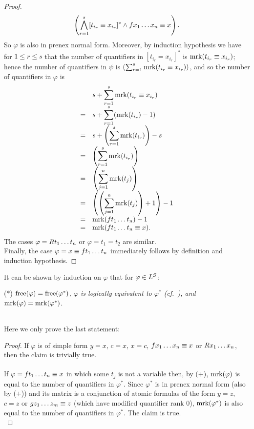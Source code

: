 \begin{enumerate}[1.]
\begin{proof}
\[
\parenadj{\bigwedge\limits^s_{r = 1} [t_{i_r} \equal x_{i_r}]^\ast \land f\enum[1]{x}{n} \equal x}.
\]
So $\varphi$ is also in prenex normal form. Moreover, by induction hypothesis we have for $1 \leq r \leq s$ that the number of quantifiers in $[t_{i_r} \equal x_{i_r}]^\ast$ is $\mrk{t_{i_r} \equal x_{i_r}}$; hence the number of quantifiers in $\psi$ is $\left(\sum^s_{r = 1} \mrk{t_{i_r} \equal x_{i_r}}\right)$, and so the number of quantifiers in $\varphi$ is
\[
\begin{array}{ll}
\ & s + \displaystyle\sum\limits^s_{r = 1} \mrk{t_{i_r} \equal x_{i_r}} \cr
= & s + \displaystyle\sum\limits^s_{r = 1} (\mrk{t_{i_r}} - 1) \cr
= & s + \left(\displaystyle\sum\limits^s_{r = 1} \mrk{t_{i_r}}\right) - s \cr
= & \left(\displaystyle\sum\limits^s_{r = 1} \mrk{t_{i_r}}\right) \cr
= & \left(\displaystyle\sum\limits^n_{j = 1} \mrk{t_j}\right) \cr
= & \left(\left(\displaystyle\sum\limits^n_{j = 1} \mrk{t_j}\right) + 1\right) - 1 \cr
= & \mrk{f\enum[1]{t}{n}} - 1 \cr
= & \mrk{f\enum[1]{t}{n} \equal x}.
\end{array}
\]
The cases $\varphi = R\enum[1]{t}{n}$ or $\varphi = t_1 \equal t_2$ are similar.\medskip\\
Finally, the case $\varphi = x \equal f\enum[1]{t}{n}$ immediately follows by definition and induction hypothesis.
\end{proof}
It can be shown by induction on $\varphi$ that for $\varphi \in \fstordlang{S}$:\smallskip\\
\begin{bquoteno}{68ex}{($\ast$)}
\emph{$\free{\varphi} = \free{\varphi^\ast}$, $\varphi$ is logically equivalent to $\varphi^\ast$ (cf.\ ), and $\mrk{\varphi} = \mrk{\varphi^\ast}$.}
\end{bquoteno}\smallskip\\
Here we only prove the last statement:
\begin{proof}
If $\varphi$ is of simple form $y \equal x$, $c \equal x$, $x \equal c$, $f\enum[1]{x}{n} \equal x$ or $R\enum[1]{x}{n}$, then the claim is trivially true.\\
\ \\
If $\varphi = f\enum[1]{t}{n} \equal x$ in which some $t_j$ is not a variable then, by ($+$), $\mrk{\varphi}$ is equal to the number of quantifiers in $\varphi^\ast$. Since $\varphi^\ast$ is in prenex normal form (also by ($+$)) and its matrix is a conjunction of atomic formulas of the form $y \equal z$, $c \equal z$ or $g\enum[1]{z}{m} \equal z$ (which have modified quantifier rank $0$), $\mrk{\varphi^\ast}$ is also equal to the number of quantifiers in $\varphi^\ast$. The claim is true.\\

\end{proof}
\end{enumerate}
